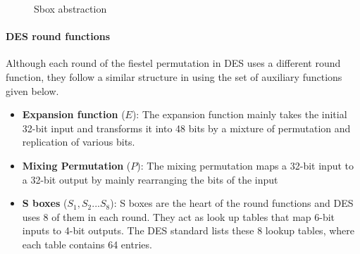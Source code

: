 \begin{figure}%
\center
{}

\caption{Sbox abstraction}
\label{fig:sbox}
\end{figure}

\paragraph{DES round functions} Although each round of the fiestel permutation in DES uses a different round function, they follow a similar structure in using the set of auxiliary functions given below. \newline
\begin{itemize}
  \item \textbf{Expansion function }($E$): The expansion function mainly takes the initial 32-bit input and transforms it into 48 bits by a mixture of permutation and replication of various bits.
  \item \textbf{Mixing Permutation} ($P$): The mixing permutation maps a 32-bit input to a 32-bit output by mainly rearranging the bits of the input
  \item \textbf{S boxes} ($S_1, S_2 ... S_8$): S boxes are the heart of the round functions and DES uses 8 of them in each round. They act as look up tables that map 6-bit inputs to 4-bit outputs. The DES standard lists these 8 lookup tables, where each table contains 64 entries.
\end{itemize}

